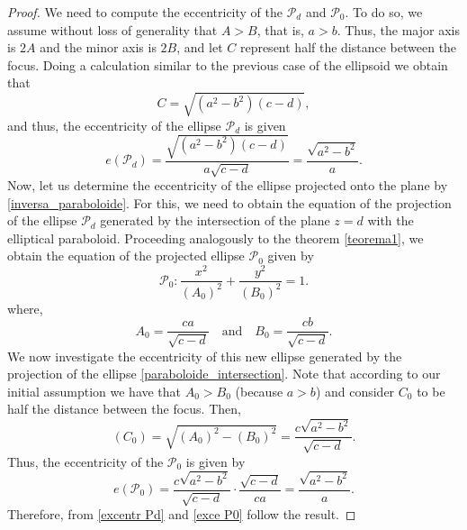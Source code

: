 \documentclass{amsart}
\theoremstyle{plain}
\numberwithin{equation}{section}
\begin{document}
\begin{proof}
	
	We need to compute the eccentricity of the $\mathcal{P}_d $ and $ \mathcal{P}_0$. To do so, we assume without loss of generality that $A > B$, that is, $a > b$. Thus, the major axis is $2A$ and the minor axis is $2B$, and let $C$ represent half the distance between the focus. Doing a calculation similar to the previous case of the ellipsoid we obtain that
	$$
	C = \sqrt{(a^2 - b^2) (c-d)},
	$$
	and thus, the eccentricity of the ellipse $\mathcal{P}_d$ is given 
	\begin{equation}\label{excentr Pd}
		e(\mathcal{P}_d) = \dfrac{\sqrt{(a^2 - b^2) (c-d)}}{a\sqrt{c-d}} = \dfrac{\sqrt{a^2-b^2}}{a}.
	\end{equation}
	Now, let us determine the eccentricity of the ellipse projected onto the plane by \eqref{inversa_paraboloide}. For this, we need to obtain the equation of the projection of the ellipse $\mathcal{P}_d$ generated by the intersection of the plane \( z = d \) with the elliptical paraboloid. Proceeding analogously to the theorem \ref{teorema1}, we obtain the equation of the projected ellipse $\mathcal{P}_0$ given by
	\begin{equation}\label{elipsenoplanoxy_pd}
		\mathcal{P}_0 :   \dfrac{x^2}{(A_0)^2} + \dfrac{y^2}{(B_0)^2} = 1.
	\end{equation}
	where, 
	\begin{equation}\label{A_0 e B_0 paraboloide}
		A_0 = \dfrac{ca}{\sqrt{c - d}} \quad \text{and} \quad B_0 = \dfrac{cb }{\sqrt{c - d}}.
	\end{equation}
	We now investigate the eccentricity of this new ellipse generated by the projection of the ellipse \eqref{paraboloide_intersection}. Note that according to our initial assumption we have that $A_0 > B_0$ (because $a > b$) and consider \( C_0 \) to be half the distance between the focus. Then,
	\begin{equation}\label{valor de C0 pd}
		(C_0) = \sqrt{(A_0)^2 - (B_0)^2} = \dfrac{c\sqrt{a^2 - b^2}}{\sqrt{c - d}}.
	\end{equation}
	Thus, the eccentricity of the $\mathcal{P}_0$ is given by 
	\begin{equation}\label{exce P0}
		e(\mathcal{P}_0) = \dfrac{c\sqrt{a^2-b^2}}{\sqrt{c-d}} \cdot \dfrac{\sqrt{c-d}}{ca} = \dfrac{\sqrt{a^2 - b^2}}{a}.
	\end{equation}
	Therefore, from \eqref{excentr Pd} and \eqref{exce P0} follow the result.
	
	
\end{proof}
\end{document}
